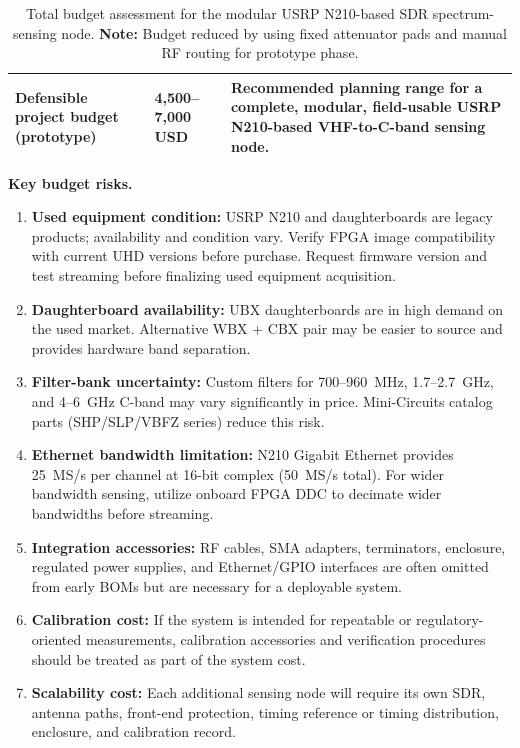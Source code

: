 \documentclass[11pt,a4paper]{article}
\newcommand{\blue}[1]{\textcolor{priceblue}{\textbf{#1}}}
\begin{document}
\begin{table}[htbp]
\begin{tabular}{p{5.4cm}p{2.8cm}p{5.7cm}}
			\midrule
			
			{\large\textbf{Defensible project budget (prototype)}} &
			{\large\blue{4,500--7,000 USD}} &
			Recommended planning range for a complete, modular, field-usable
			USRP N210-based VHF-to-C-band sensing node. \\
			
			\bottomrule
		\end{tabular}
		\caption{Total budget assessment for the modular USRP N210-based SDR spectrum-sensing node.
			\textbf{Note:} Budget reduced by using fixed attenuator pads and manual RF routing for prototype phase.}
		\label{tab:total-bom-assessment}
	\end{table}
	
	\noindent
	\textbf{Key budget risks.}
	\begin{enumerate}
		\item \textbf{Used equipment condition:} USRP N210 and daughterboards are
		legacy products; availability and condition vary. Verify FPGA image
		compatibility with current UHD versions before purchase. Request firmware
		version and test streaming before finalizing used equipment acquisition.
		\item \textbf{Daughterboard availability:} UBX daughterboards are in high
		demand on the used market. Alternative WBX + CBX pair may be easier to source
		and provides hardware band separation.
		\item \textbf{Filter-bank uncertainty:} Custom filters for 700--960~MHz,
		1.7--2.7~GHz, and 4--6~GHz C-band may vary significantly in price.
		Mini-Circuits catalog parts (SHP/SLP/VBFZ series) reduce this risk.
		\item \textbf{Ethernet bandwidth limitation:} N210 Gigabit Ethernet provides
		25~MS/s per channel at 16-bit complex (50~MS/s total). For wider bandwidth
		sensing, utilize onboard FPGA DDC to decimate wider bandwidths before streaming.
		\item \textbf{Integration accessories:} RF cables, SMA adapters, terminators,
		enclosure, regulated power supplies, and Ethernet/GPIO interfaces are often
		omitted from early BOMs but are necessary for a deployable system.
		\item \textbf{Calibration cost:} If the system is intended for repeatable or
		regulatory-oriented measurements, calibration accessories and verification
		procedures should be treated as part of the system cost.
		\item \textbf{Scalability cost:} Each additional sensing node will require its
		own SDR, antenna paths, front-end protection, timing reference or timing
		distribution, enclosure, and calibration record.
	\end{enumerate}
	
\end{document}
